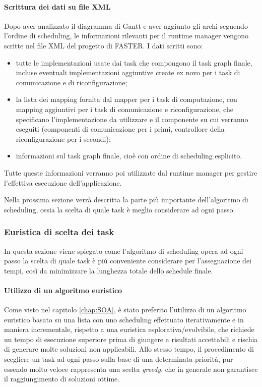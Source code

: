 \paragraph{Scrittura dei dati su file XML}
Dopo aver analizzato il diagramma di Gantt e aver aggiunto gli archi seguendo 
l'ordine di scheduling, le informazioni rilevanti per il runtime manager 
vengono scritte nel file XML del progetto di \ac{FASTER}. I dati scritti sono:
\begin{itemize}
 \item tutte le implementazioni usate dai task che compongono il task graph 
finale, incluse eventuali implementazioni aggiuntive create ex novo per i task di 
comunicazione e di riconfigurazione;
 \item la lista dei mapping fornita dal mapper per i task di computazione, con 
mapping aggiuntivi per i task di comunicazione e riconfigurazione, che 
specificano l'implementazione da utilizzare e il componente su cui verranno 
eseguiti (componenti di comunicazione per i primi, controllore della 
riconfigurazione per i secondi);
 \item informazioni sul task graph finale, cioè con ordine di scheduling 
esplicito.
\end{itemize}

Tutte queste informazioni verranno poi utilizzate dal runtime manager per 
gestire l'effettiva esecuzione dell'applicazione.

Nella prossima sezione verrà descritta la parte più importante dell'algoritmo 
di scheduling, ossia la scelta di quale task è meglio considerare ad ogni 
passo.


\subsubsection{Euristica di scelta dei task}
\label{subsec:euristicaSceltaTask}
In questa sezione viene spiegato come l'algoritmo di scheduling opera ad ogni 
passo la scelta di quale task è più conveniente considerare per l'assegnazione 
dei tempi, così da minimizzare la lunghezza totale dello schedule finale.

\paragraph{Utilizzo di un algoritmo euristico}
Come visto nel capitolo \ref{chap:SOA}, è stato preferito l'utilizzo di un 
algoritmo euristico basato su una lista con uno scheduling effettuato 
iterativamente e in maniera incrementale, rispetto a una euristica 
esplorativa/evolvibile, che richiede un tempo di esecuzione superiore prima di 
giungere a risultati accettabili e rischia di generare molte soluzioni non 
applicabili. Allo stesso tempo, il procedimento di scegliere un task ad ogni 
passo sulla base di una determinata priorità, pur essendo molto veloce 
rappresenta una scelta \emph{greedy}, che in generale non garantisce il 
raggiungimento di soluzioni ottime.


